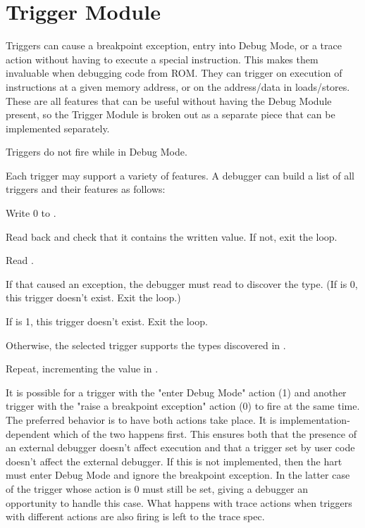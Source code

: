 \chapter{Trigger Module}
\label{sec:trigger}

Triggers can cause a breakpoint exception, entry into Debug Mode, or a trace action
without having to execute a special instruction. This makes them invaluable
when debugging code from ROM. They can trigger on execution of instructions at
a given memory address, or on the address/data in loads/stores.  These are all
features that can be useful without having the Debug Module present, so the
Trigger Module is broken out as a separate piece that can be implemented
separately.

Triggers do not fire while in Debug Mode.

\begin{steps}{Each trigger may support a variety of features. A debugger can
    build a list of all triggers and their features as follows:}
\item Write 0 to \Rtselect.
\item Read back \Rtselect and check that it contains the written value. If not,
    exit the loop.
\item Read \Rtinfo.
\item If that caused an exception, the debugger must read \Rtdataone to
    discover the type. (If \Ftype is 0, this trigger doesn't exist. Exit the
    loop.)
\item If \Finfo is 1, this trigger doesn't exist. Exit the loop.
\item Otherwise, the selected trigger supports the types discovered in \Finfo.
\item Repeat, incrementing the value in \Rtselect.
\end{steps}

It is possible for a trigger with the "enter Debug Mode" action (1) and another
trigger with the "raise a breakpoint exception" action (0) to fire at the same
time. The preferred behavior is to have both actions take place.  It is
implementation-dependent which of the two happens first.  This ensures both
that the presence of an external debugger doesn't affect execution and that a
trigger set by user code doesn't affect the external debugger. If this is not
implemented, then the hart must enter Debug Mode and ignore the breakpoint
exception. In the latter case \Fhit of the trigger whose action is 0 must still
be set, giving a debugger an opportunity to handle this case. What happens with
trace actions when triggers with different actions are also firing is left to
the trace spec.

